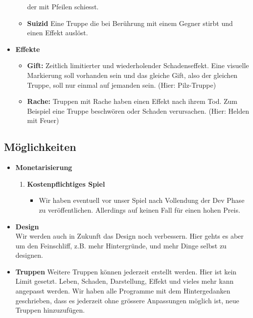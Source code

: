 \begin{itemize}
\begin{itemize}
            der mit Pfeilen schiesst.
        \item \textbf{Suizid}
            Eine Truppe die bei Berührung mit einem Gegner stirbt und einen Effekt auslöst.
    \end{itemize}
    \item \textbf{Effekte}
    \begin{itemize}
        \item \textbf{Gift:}
            Zeitlich limitierter und wiederholender Schadenseffekt. Eine visuelle Markierung soll vorhanden sein
            und das gleiche Gift, also der gleichen Truppe, soll nur einmal auf jemanden sein. (Hier: Pilz-Truppe)
        \item \textbf{Rache:}
            Truppen mit Rache haben einen Effekt nach ihrem Tod. Zum Beispiel eine Truppe beschwören oder Schaden verursachen. (Hier: Helden mit Feuer)
    \end{itemize}
\end{itemize}

\subsection*{Möglichkeiten}
\begin{itemize}
    \item \textbf{Monetarisierung} \\
    \begin{enumerate}
        \item \textbf{Kostenpflichtiges Spiel}
        \begin{itemize}
            \item Wir haben eventuell vor unser Spiel nach Vollendung der Dev Phase zu veröffentlichen. Allerdings auf keinen Fall für einen hohen Preis.
        \end{itemize}
    \end{enumerate}
    \item \textbf{Design} \\
        Wir werden auch in Zukunft das Design noch verbessern. Hier gehts es aber um den Feinschliff, z.B. mehr Hintergründe, und mehr Dinge selbst zu designen.
    \item \textbf{Truppen}
        Weitere Truppen können jederzeit erstellt werden. Hier ist kein Limit gesetzt. Leben, Schaden, Darstellung, Effekt und vieles mehr kann angepasst werden. 
        Wir haben alle Programme mit dem Hintergedanken geschrieben, dass es jederzeit ohne grössere Anpassungen möglich ist, neue Truppen hinzuzufügen.
    
\end{itemize}

